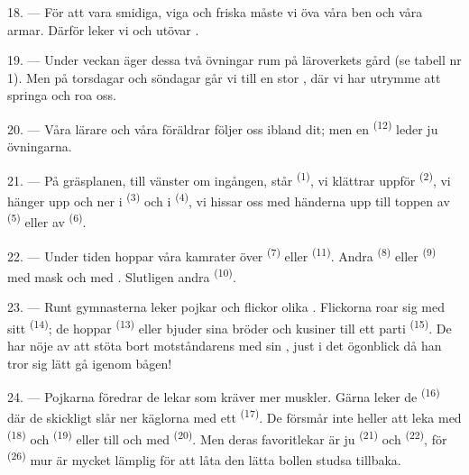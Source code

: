 18. --- För att vara smidiga, viga och friska måste vi öva våra ben och våra armar. Därför
leker vi och utövar .

19. --- Under veckan äger dessa två övningar rum på läroverkets gård (se tabell nr 1). Men på
torsdagar och söndagar går vi till en stor , där vi har utrymme att springa
och roa oss.

20. --- Våra lärare och våra föräldrar följer oss ibland dit; men en
 \textsuperscript{(12)} leder ju övningarna.

21. --- På gräsplanen, till vänster om ingången, står
 \textsuperscript{(1)}, vi klättrar uppför
 \textsuperscript{(2)}, vi hänger upp och ner i 
\textsuperscript{(3)} och i  \textsuperscript{(4)}, vi hissar oss med
händerna upp till toppen av  \textsuperscript{(5)} eller av
 \textsuperscript{(6)}.

22. --- Under tiden hoppar våra kamrater över  \textsuperscript{(7)} eller
 \textsuperscript{(11)}. Andra
 \textsuperscript{(8)} eller  \textsuperscript{(9)}
med mask och med . Slutligen  andra
 \textsuperscript{(10)}.

\VUsaut{4.6mm}
\VUsaut{3.0mm}

23. --- Runt gymnasterna leker pojkar och flickor olika . Flickorna roar sig med
sitt  \textsuperscript{(14)}; de hoppar
 \textsuperscript{(13)} eller bjuder sina bröder och kusiner till ett
parti  \textsuperscript{(15)}. De har nöje av att stöta bort motståndarens
 med sin , just i det ögonblick då han tror sig lätt gå igenom
bågen!

24. --- Pojkarna föredrar de lekar som kräver mer muskler. Gärna leker de
 \textsuperscript{(16)} där de skickligt slår ner käglorna med
ett  \textsuperscript{(17)}. De försmår inte heller att leka med
 \textsuperscript{(18)} och 
\textsuperscript{(19)} eller till och med  \textsuperscript{(20)}. Men deras
favoritlekar är ju  \textsuperscript{(21)} och 
\textsuperscript{(22)}, för  \textsuperscript{(26)} mur är mycket lämplig
för att låta den lätta bollen studsa tillbaka.

